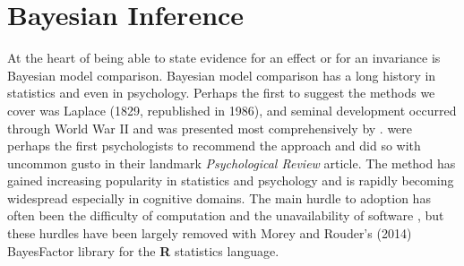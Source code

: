 \documentclass[fignum,nobf,man]{apa}
\begin{document}
\section{Bayesian Inference}
At the heart of being able to state evidence for an effect or for an invariance is Bayesian model comparison.  Bayesian model comparison has a long history in statistics and even in psychology.  Perhaps the first to suggest the methods we cover was Laplace (1829, republished in 1986), and seminal development occurred through World War II and was presented most comprehensively by \citet{Jeffreys:1961}.  \citet{Edwards:etal:1963} were perhaps the first psychologists to recommend the approach and did so with uncommon gusto in their landmark {\em Psychological Review} article.  The method has gained increasing popularity in statistics and psychology \citep{Berger:1996,Gallistel:2009,Raftery:1995,Rouder:etal:2009a,Wagenmakers:2007} and is rapidly becoming widespread especially in cognitive domains.  
The main hurdle to adoption has often been the difficulty of computation and the unavailability of software \citep{Gallistel:2009}, but these hurdles have been largely removed with Morey and Rouder's (2014) BayesFactor library for the {\bf R} statistics language.

\nocite{Laplace:1986,Morey:Rouder:2014}
\end{document}
